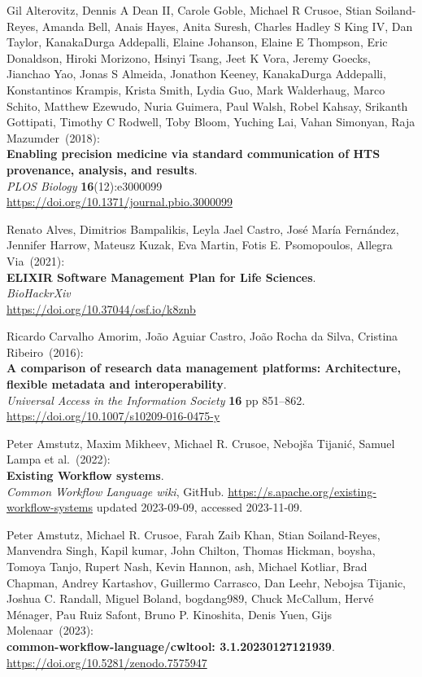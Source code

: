 \begin{thebibliography}{9}
Gil Alterovitz, Dennis A Dean II, Carole Goble, Michael R
Crusoe, Stian Soiland-Reyes, Amanda Bell, Anais Hayes, Anita Suresh,
Charles Hadley S King IV, Dan Taylor, KanakaDurga Addepalli, Elaine
Johanson, Elaine E Thompson, Eric Donaldson, Hiroki Morizono, Hsinyi
Tsang, Jeet K Vora, Jeremy Goecks, Jianchao Yao, Jonas S Almeida,
Jonathon Keeney, KanakaDurga Addepalli, Konstantinos Krampis, Krista
Smith, Lydia Guo, Mark Walderhaug, Marco Schito, Matthew Ezewudo, Nuria
Guimera, Paul Walsh, Robel Kahsay, Srikanth Gottipati, Timothy C
Rodwell, Toby Bloom, Yuching Lai, Vahan Simonyan, Raja Mazumder~(2018): \\
\textbf{Enabling precision medicine via standard communication of HTS
provenance, analysis, and results}.\\
\emph{PLOS Biology} \textbf{16}(12):e3000099\\
\url{https://doi.org/10.1371/journal.pbio.3000099}

Renato Alves, Dimitrios Bampalikis, Leyla Jael Castro,
José María Fernández, Jennifer Harrow, Mateusz Kuzak, Eva Martin, Fotis
E. Psomopoulos, Allegra Via~(2021): \\
\textbf{ELIXIR Software Management Plan for Life Sciences}.\\
\emph{BioHackrXiv}\\
\url{https://doi.org/10.37044/osf.io/k8znb}

Ricardo Carvalho Amorim, João Aguiar Castro, João Rocha da
Silva, Cristina Ribeiro~(2016): \\
\textbf{A comparison of research data management platforms:
Architecture, flexible metadata and interoperability}.\\
\emph{Universal Access in the Information Society} \textbf{16} pp
851--862.\\
\url{https://doi.org/10.1007/s10209-016-0475-y}

Peter Amstutz, Maxim Mikheev, Michael R. Crusoe, Nebojša Tijanić, Samuel Lampa et al.~(2022): \\
\textbf{Existing Workflow systems}.\\
\emph{Common Workflow Language wiki}, GitHub. 
\url{https://s.apache.org/existing-workflow-systems} updated 2023-09-09, accessed 2023-11-09.

Peter Amstutz, Michael R. Crusoe, Farah Zaib Khan, Stian Soiland-Reyes, Manvendra Singh, Kapil kumar, John Chilton, Thomas Hickman, boysha, Tomoya Tanjo, Rupert Nash, Kevin Hannon, ash, Michael Kotliar, Brad Chapman, Andrey Kartashov, Guillermo Carrasco, Dan Leehr, Nebojsa Tijanic, Joshua C. Randall, Miguel Boland, bogdang989, Chuck McCallum, Hervé Ménager, Pau Ruiz Safont, Bruno P. Kinoshita, Denis Yuen, Gijs Molenaar~(2023): \\
\textbf{common-workflow-language/cwltool: 3.1.20230127121939}.\\
\url{https://doi.org/10.5281/zenodo.7575947}


\end{thebibliography}
